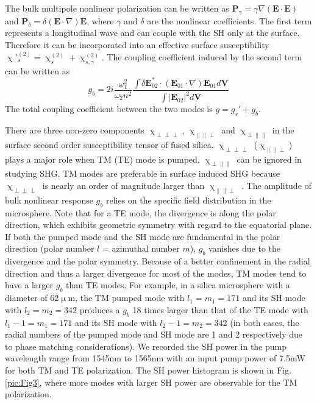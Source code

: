 \documentclass[a4paper,8pt,hyperref, twocolumn]{article}
\begin{document}
The bulk multipole nonlinear polarization can be written as $\mathbf{P}_\gamma =  \gamma\nabla(\mathbf{E}\cdot\mathbf{E})$ and $\mathbf{P}_\delta =  \delta(\mathbf{E}\cdot\nabla)\mathbf{E}$, where $\gamma$ and $\delta$ are the nonlinear coefficients. The first term represents a longitudinal wave and can couple with the SH only at the surface. Therefore it can be incorporated into an effective surface susceptibility $\upchi'^{(2)}_s = \upchi^{(2)}_s+\upchi^{(2)}_{s,\gamma}$\cite{heinz1991second}. The coupling coefficient induced by the second term can be written as %
\begin{equation}
g_b =  2i\frac{\omega_1^2}{\omega_2n^2}\frac{\int \delta\mathbf{E}_{02}^* \cdot (\mathbf{E}_{01}\cdot\nabla)\mathbf{E}_{01} d\mathbf{V}}{\int |\mathbf{E}_{02}|^2 d\mathbf{V}}
\label{eq:gb}
\end{equation}
The total coupling coefficient between the two modes is $g = g_s'+g_b$. 

There are three non-zero components $\upchi_{\perp \perp \perp}$, $\upchi_{\parallel \parallel \perp}$ and $\upchi_{\perp \parallel \parallel}$ in the surface second order susceptibility tensor of fused silica.  $\upchi_{\perp \perp \perp}$ ($\upchi_{\parallel \parallel \perp}$) plays a major role when TM (TE) mode is pumped. $\upchi_{\perp \parallel \parallel}$ can be ignored in studying SHG. TM modes are preferable in surface induced SHG because $\upchi_{\perp \perp \perp}$ is nearly an order of magnitude larger than $\upchi_{\parallel \parallel \perp}$ \cite{rodriguez2008calibration}. The amplitude of bulk nonlinear response $g_b$ relies on the specific field distribution in the microsphere.  Note that for a TE mode, the divergence is along the polar direction, which exhibits geometric symmetry with regard to the equatorial plane. If both the pumped mode and the SH mode are fundamental in the polar direction (polar number $l$ = azimuthal number $m$), $g_b$ vanishes due to the divergence and the polar symmetry. Because of a better confinement in the radial direction and thus a larger divergence for most of the modes, TM modes tend to have a larger $g_b$ than TE modes. For example, in a silica microsphere with a diameter of 62$\upmu$m, the TM pumped mode with $l_1=m_1=171$ and its SH mode with $l_2=m_2=342$ produces a $g_b$ 18 times larger than that of the TE mode with $l_1-1=m_1=171$ and its SH mode with $l_2-1=m_2=342$ (in both cases, the radial numbers of the pumped mode and SH mode are 1 and 2 respectively due to phase matching considerations). We recorded the SH power in the pump wavelength range from 1545nm to 1565nm with an input pump power of 7.5mW for both TM and TE polarization. The SH power histogram is shown in Fig.\ref{pic:Fig3}, where more modes with larger SH power are observable for the TM polarization.
\end{document}
